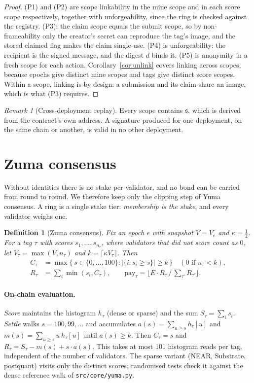 \documentclass[11pt]{article}
\newtheorem{definition}{Definition}
\theoremstyle{remark}
\newtheorem{remark}{Remark}
\newcommand{\tg}{\tau}
\begin{document}
\begin{proof}
(P1) and (P2) are scope linkability in the mine scope and in each score scope respectively, together with unforgeability, since the ring is checked against the registry. (P3): the claim scope equals the submit scope, so by non-frameability only the creator's secret can reproduce the tag's image, and the stored claimed flag makes the claim single-use. (P4) is unforgeability: the recipient is the signed message, and the digest $d$ binds it. (P5) is anonymity in a fresh scope for each action. Corollary~\ref{cor:unlink} covers linking across scopes, because epochs give distinct mine scopes and tags give distinct score scopes. Within a scope, linking is by design: a submission and its claim share an image, which is what (P3) requires.
\end{proof}

\begin{remark}[Cross-deployment replay]
Every scope contains $\mathfrak{s}$, which is derived from the contract's own address. A signature produced for one deployment, on the same chain or another, is valid in no other deployment.
\end{remark}

\section{Zuma consensus}\label{sec:zuma}

Without identities there is no stake per validator, and no bond can be carried from round to round. We therefore keep only the clipping step of Yuma consensus. A ring is a single stake tier: \emph{membership is the stake}, and every validator weighs one.

\begin{definition}[Zuma consensus]
Fix an epoch $e$ with snapshot $V = V_e$ and $\kappa = \tfrac12$. For a tag $\tg$ with scores $s_1,\ldots,s_{n_\tg}$, where validators that did not score count as $0$, let $V_\tg = \max(V, n_\tg)$ and $k = \lceil \kappa V_\tg\rceil$. Then
\begin{align*}
C_\tg &= \max\{\, s\in\{0,\ldots,100\} : |\{ i : s_i \ge s\}| \ge k \,\}\quad(\text{$0$ if } n_\tg < k),\\
R_\tg &= \textstyle\sum_i \min(s_i, C_\tg), \qquad \mathrm{pay}_\tg = \big\lfloor E\cdot R_\tg \,/\, \sum_{\tg'} R_{\tg'} \big\rfloor .
\end{align*}
\end{definition}

\paragraph{On-chain evaluation.} \emph{Score} maintains the histogram $h_\tg$ (dense or sparse) and the sum $S_\tg = \sum_i s_i$. \emph{Settle} walks $s = 100, 99, \ldots$ and accumulates $a(s) = \sum_{u\ge s}h_\tg[u]$ and $m(s) = \sum_{u\ge s}u\,h_\tg[u]$ until $a(s)\ge k$. Then $C_\tg = s$ and $R_\tg = S_\tg - m(s) + s\cdot a(s)$. This takes at most 101 histogram reads per tag, independent of the number of validators. The sparse variant (NEAR, Substrate, postquant) visits only the distinct scores; randomised tests check it against the dense reference walk of \texttt{src/core/yuma.py}.
\end{document}
